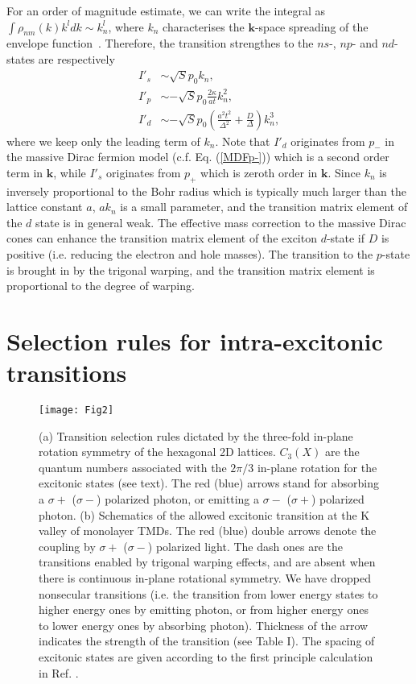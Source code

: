 \documentclass[prb,twocolumn,amsmath,amssymb,superscriptaddress,showpacs]{revtex4}
\begin{document}
For an order of magnitude estimate, we can write the integral as $\int \rho_{nm}(k) k^l dk \sim k_n^l$, where $k_{n}$ characterises the $\mathbf k$-space spreading of the envelope function~\cite{2D hydrogen k-space wf}. Therefore, the transition strengthes to the $ns$-, $np$- and $nd$-states are respectively
\begin{subequations}
\label{strengthwkn}
\begin{align}
I'_{s} &\sim \sqrt{S} p_0 k_{n}, \label{IsTW} \\
I'_{p} &\sim -\sqrt{S} p_0\frac{2\kappa}{at}k_{n}^{2}, \label{Ip} \\
I'_{d} &\sim -\sqrt{S} p_0(\frac{a^{2}t^{2}}{\Delta^{2}}+\frac{D}{\Delta})k_{n}^{3}, \label{IdTW}
\end{align}
\end{subequations}
where we keep only the leading term of $k_n$. Note that $I'_{d}$ originates from $p_{-}$ in the massive Dirac fermion model (c.f. Eq. (\ref{MDFp-})) which is a second order term in $\mathbf{k}$, while $I'_{s}$ originates from $p_{+}$ which is zeroth order in $\mathbf{k}$. Since $k_n$ is inversely proportional to the Bohr radius which is typically much larger than the lattice constant $a$, $a k_n$ is a small parameter, and the transition matrix element of the $d$ state is in general weak. The effective mass correction to the massive Dirac cones can enhance the transition matrix element of the exciton $d$-state if $D$ is positive (i.e. reducing the electron and hole masses). The transition to the $p$-state is brought in by the trigonal warping, and the transition matrix element is proportional to the degree of warping.

\section{Selection rules for intra-excitonic transitions \label{sectionIntra}}
\begin{figure}
\texttt{[image: Fig2]}
\caption{(a) Transition selection rules dictated by the three-fold in-plane rotation symmetry of the hexagonal 2D lattices. $C_{3}(X)$ are the quantum numbers associated with the $2 \pi/3$ in-plane rotation for the excitonic states (see text). The red (blue) arrows stand for absorbing a $\sigma +$ ($\sigma -$) polarized photon, or emitting a $\sigma -$ ($\sigma +$) polarized photon. (b) Schematics of the allowed excitonic transition at the K valley of monolayer TMDs. The red (blue) double arrows denote the coupling by $\sigma +$ ($\sigma -$) polarized light. The dash ones are the transitions enabled by trigonal warping effects, and are absent when there is continuous in-plane rotational symmetry. We have dropped nonsecular transitions (i.e. the transition from lower energy states to higher energy ones by emitting photon, or from higher energy ones to lower energy ones by absorbing photon). Thickness of the arrow indicates the strength of the transition (see Table I). The spacing of excitonic states are given according to the first principle calculation in Ref. . }
\end{figure}
\end{document}
